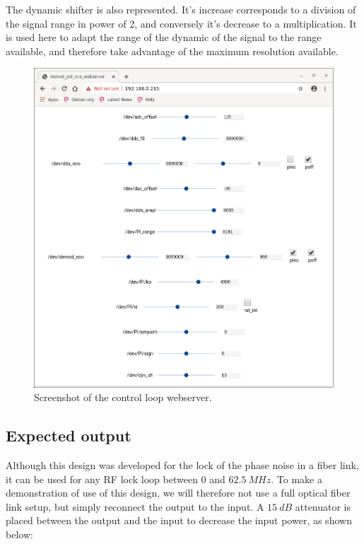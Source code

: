 \documentclass[12pt,oneside]{article}
\begin{document}
The dynamic shifter is also represented. It's increase corresponds to a division of the signal range in power of 2, and conversely it's decrease to a multiplication. It is used here to adapt the range of the dynamic of the signal to the range available, and therefore take advantage of the maximum resolution available.

\begin{figure}[h!tb]
	\begin{center}
		\vspace{0.5cm}
		\includegraphics[width=15cm,trim={0cm 0cm 0cm 0cm}, clip]{webserver/2020-02-17-151626_889x946_scrot.png}
		\caption{Screenshot of the control loop webserver.}
		\label{fig:pll_webserver}
	\end{center}
\end{figure}

\newpage

\subsection{Expected output}

Although this design was developed for the lock of the phase noise in a fiber link, it can be used for any RF lock loop between $0$ and $62.5~MHz$. To make a demonstration of use of this design, we will therefore not use a full optical fiber link setup, but simply reconnect the output to the input. A $15~dB$ attenuator is placed between the output and the input to decrease the input power, as shown below: 
\end{document}
